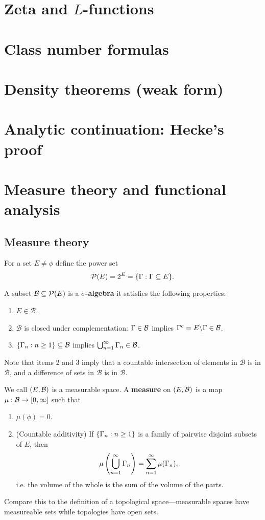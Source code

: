 \section{Zeta and $L$-functions}
\section{Class number formulas}
\section{Density theorems (weak form)}
\section{Analytic continuation: Hecke's proof}
\section{Measure theory and functional analysis}
\subsection{Measure theory}
For a set $E\neq \phi$ define the power set
\[\mathcal P(E)=2^E=\{\Ga:\Ga\subeq E\}.\]
\begin{df}\label{salgdf}
A subset $\mathcal B\subeq \mathcal P(E)$ is a $\sigma$\textbf{-algebra} it satisfies the following properties:
\begin{enumerate}
\item $E\in \mathcal B$.
\item $\mathcal B$ is closed under complementation: $\Ga\in \mathcal B$ implies $\Ga^c=E\backslash \Ga\in \cal B$.
\item $\{\Ga_n:n\geq 1\}\subeq \cal B$ implies $\bigcup_{n=1}^{\infty} \Ga_n\in \cal B$.
\end{enumerate}
\end{df}
Note that items 2 and 3 imply that a countable intersection of elements in $\mathcal B$ is in $\mathcal B$, and a difference of sets in $\mathcal B$ is in $\mathcal B$.
\begin{df}
We call 
$(E, \cal B)$ is a measurable space. A \textbf{measure} on $(E,\cal B)$ is a map $\mu:\cal B\to [0,\infty]$ such that 
\begin{enumerate}
\item $\mu(\phi)=0$.
\item (Countable additivity) If $\{\Ga_n:n\geq 1\}$ is a family of pairwise disjoint subsets of $E$, then
\[
\mu\pa{\bigcup_{n=1}^{\infty}\Ga_n}=\sum_{n=1}^{\infty} \mu(\Ga_n),
\]
i.e. the volume of the whole is the sum of the volume of the parts.
\end{enumerate}
\end{df}
Compare this to the definition of a  topological space---measurable spaces have measureable sets while topologies have open sets.

